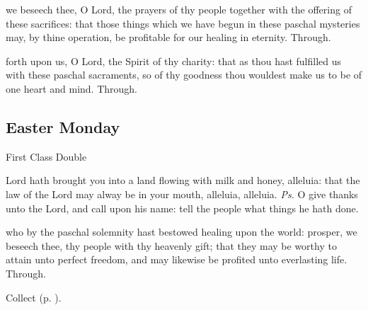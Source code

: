 
\secret\label{EasterSecret}
 we beseech thee, O Lord, the prayers of thy people together with the offering of these sacrifices: that those things which we have begun in these paschal mysteries may, by thine operation, be profitable for our healing in eternity. Through.


\postcommunion\label{EasterPostcommunion}
 forth upon us, O Lord, the Spirit of thy charity: that as thou hast fulfilled us with these paschal sacraments, so of thy goodness thou wouldest make us to be of one heart and mind. Through.


\subsection{Easter Monday}
\begin{inhead}
    {First Class Double}
\end{inhead}


\introit
{} Lord hath brought you into a land flowing with milk and honey, alleluia: that the law of the Lord may alway be in your mouth, alleluia, alleluia. \textit{Ps.} O give thanks unto the Lord, and call upon his name: tell the people what things he hath done.

\collect
 who by the paschal solemnity hast bestowed healing upon the world: prosper, we beseech thee, thy people with thy heavenly gift; that they may be worthy to attain unto perfect freedom, and may likewise be profited unto everlasting life. Through.
\begin{rubric}
     Collect  (p. \pageref{EasterCollect}).
\end{rubric}

